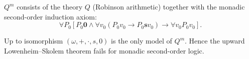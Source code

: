 $Q^m$ consists of the theory $Q$ (Robinson arithmetic) together with the monadic second-order induction axiom:
$$\forall P_0 [P_0 \mathbf{0} \wedge \forall v_0 (P_0 v_0 \rightarrow P_0 \mathbf{s} v_0) \rightarrow \forall v_0 P_0 v_0].$$

Up to isomorphism $(\omega, +, \cdot, s, 0)$ is the only model of $Q^m$. Hence the upward Lowenheim--Skolem theorem fails for monadic second-order logic.
